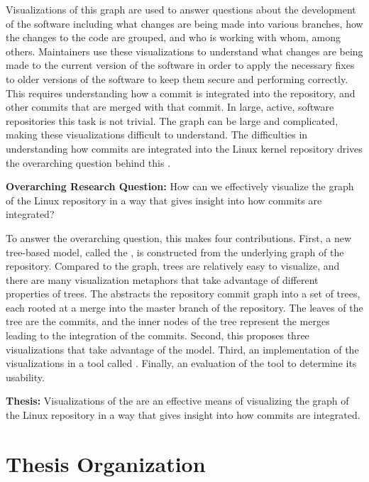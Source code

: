 Visualizations of this graph are used to answer questions about the
development of the software including what changes are being made into
various branches, how the changes to the code are grouped, and who is
working with whom, among others. Maintainers use these visualizations to
understand what changes are being made to the current version of the
software in order to apply the necessary fixes to older versions of the
software to keep them secure and performing correctly. This requires
understanding how a commit is integrated into the repository, and other
commits that are merged with that commit. In large, active, software
repositories this task is not trivial.
The graph can be large and
complicated, making these visualizations difficult to understand.
The difficulties in understanding how commits are integrated into the
Linux kernel repository drives the overarching question behind this
\paper{}.

\begin{textbox}
  \textbf{Overarching Research Question:} How can we effectively
  visualize the graph of the Linux repository in a way that gives
  insight into how commits are integrated?
\end{textbox}

To answer the overarching question, this \paper{} makes four
contributions.
First, a new tree-based model, called the \mt{},
is constructed from the underlying graph of the repository.
Compared to the graph, trees are relatively easy to visualize, and there are many visualization metaphors that take advantage of different properties of trees.
The \mt{} abstracts the repository commit graph into a set of trees, each rooted at a merge into the master branch of the repository.
The leaves of the tree are the commits, and the inner nodes of the tree represent the merges leading to the integration of the commits.
Second, this \paper{} proposes three visualizations that take advantage of the \mt{} model.
Third, an implementation of the visualizations in a tool called \tool{}.
Finally, an evaluation of the tool to determine its usability.

\begin{textbox}
  \textbf{Thesis:} Visualizations of the \mt{} are an effective means of
  visualizing the graph of the Linux repository in a way that gives
  insight into how commits are integrated.
\end{textbox}

\section{Thesis Organization}\label{sec:thesis_organization}

